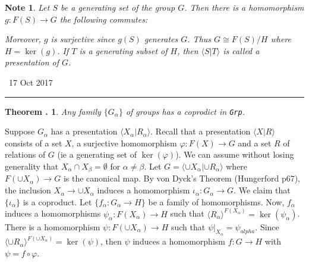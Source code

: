 \documentclass[twoside]{report}
\newcommand{\cat}[1]{\texttt{#1}}
\newcounter{Lecture}
\newcommand{\newLec}[1]{
  \stepcounter{Lecture}
  \noindent{\Large\bf Lecture \arabic{Lecture}} \, #1 \hfill  \rule[1ex]{2.5in}{.1pt} \vspace{1em}
}
\theoremstyle{myts}
\newcounter{c}[Lecture]
\newtheorem{thm}[c]{Theorem \arabic{Lecture}.}
\newtheorem*{nte}{Note}
\newcounter{ex}
\newenvironment{prf}{
  \noindent\begin{mdframed}[style=prf]}{\end{mdframed} \vspace{1em}
}
\begin{document}
\begin{nte}
  Let \(S\) be a generating set of the group $G$. Then there is a homomorphism \(g:F(S) \to G \) the following commutes:
  \begin{center}
  \end{center}
  Moreover, $g$ is surjective since \(g(S)\) generates $G$. Thus \(G\cong F(S)/H\) where \(H= \ker(g) \). If $T$ is a generating subset of $H$, then \( \langle S | T \rangle \) is called a \emph{presentation} of $G$.
\end{nte}

\newLec{17 Oct 2017}

\begin{thm}
  Any family \( \{ G_\alpha \} \) of groups has a coprodict in \cat{Grp}.
\end{thm}

\begin{prf}
  Suppose \(G_\alpha\) has a presentation \(\langle X_\alpha | R_\alpha \rangle \). Recall that a presentation \(\langle X | R \rangle \) consists of a set $X$, a surjective homomorphism \( \varphi : F(X) \to G \) and a set $R$ of relations of $G$ (ie a generating set of \(\ker(\varphi)\)). We can assume without losing generality that \(X_\alpha \cap X_\beta = \emptyset\) for \(\alpha \neq \beta \). Let \( G = \langle \cup X_\alpha | \cup R_\alpha \rangle \) where \( F(\cup X_\alpha ) \to G \) is the canonical map. By von Dyck's Theorem (Hungerford p67), the inclusion \( X_\alpha \to \cup X_\alpha \) induces a homomorphism \(\iota_\alpha : G_\alpha \to G \). We claim that \(\{ \iota_\alpha \}\) is a coproduct. Let \(\{ f_\alpha : G_\alpha \to H \}\) be a family of homomorphisms. Now, \(f_\alpha\) induces a homomorphisms \( \psi_\alpha : F(X_\alpha) \to H \) such that \( \langle R_\alpha \rangle ^{F(X_\alpha)} = \ker(\psi_\alpha) \). There is a homomorphism \( \psi : F(\cup X_\alpha) \to H \) such that \( \psi|_{X_\alpha} = \psi_{alpha} \). Since \( \langle \cup R_\alpha \rangle ^{F(\cup X_\alpha)} = \ker(\psi) \), then \(\psi\) induces a homomorphism \(f:G\to H\) with \( \psi = f\circ \varphi \).
\end{prf}
\end{document}

